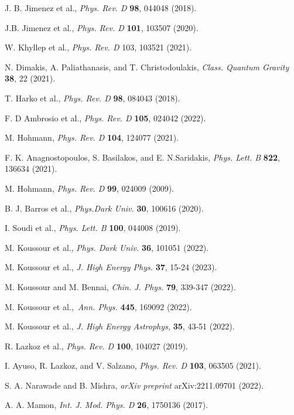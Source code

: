 \documentclass[prd,superscriptaddress,amsfonts,amssymb,amsmath,showpacs,twocolumn]{revtex4-2}
\begin{document}
\begin{thebibliography}{99}
 J. B. Jimenez et al., \textit{Phys. Rev. D} \textbf{98}, 044048
(2018).

 J.B. Jimenez et al., \textit{Phys. Rev. D} \textbf{101}, 103507
(2020).

 W. Khyllep et al., \textit{Phys. Rev. D} 103, 103521 (2021).

 N. Dimakis, A. Paliathanasis, and T. Christodoulakis, \textit{%
Class. Quantum Gravity} \textbf{38}, 22 (2021).

 T. Harko et al., \textit{Phys. Rev. D} \textbf{98}, 084043
(2018).

 F. D Ambrosio et al., \textit{Phys. Rev. D} \textbf{105}, 024042 (2022).

 M. Hohmann, \textit{Phys. Rev. D} \textbf{104}, 124077 (2021).

 F. K. Anagnostopoulos, S. Basilakos, and E. N.Saridakis, \textit{Phys. Lett. B} \textbf{822}, 136634 (2021).

 M. Hohmann, \textit{Phys. Rev. D} \textbf{99}, 024009 (2009).

 B. J. Barros et al., \textit{Phys.Dark Univ.} \textbf{30}, 100616 (2020).

 I. Soudi et al., \textit{Phys. Lett. B} \textbf{100}, 044008 (2019).

 M. Koussour et al., \textit{Phys. Dark Univ.} \textbf{36}, 101051 (2022).

 M. Koussour et al., \textit{J. High Energy Phys.} \textbf{37}, 15-24 (2023).

 M. Koussour and M. Bennai, \textit{Chin. J. Phys.} \textbf{79}, 339-347 (2022).

 M. Koussour et al.,{\ }\textit{Ann. Phys.} \textbf{445}, 169092 (2022).

 M. Koussour et al., \textit{J. High Energy Astrophys, } \textbf{35}, 43-51 (2022).

 R. Lazkoz et al., \textit{Phys. Rev. D} \textbf{100}, 104027 (2019).

 I. Ayuso, R. Lazkoz, and V. Salzano, \textit{Phys. Rev. D} \textbf{103}, 063505 (2021).

 S. A. Narawade and B. Mishra, \textit{arXiv preprint} arXiv:2211.09701 (2022).


 A. A. Mamon, \textit{Int. J. Mod. Phys. D} \textbf{26}, 1750136
(2017).


\end{thebibliography}
\end{document}
